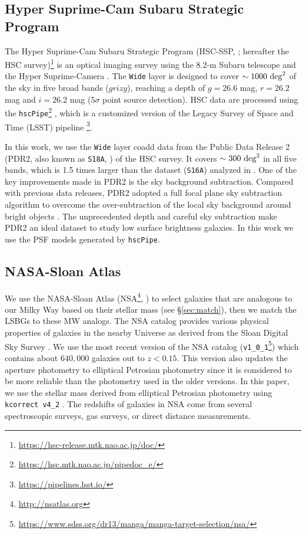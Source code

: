 \documentclass[twocolumn,astrosymb,twocolappendix]{aastex631}
\newcommand{\code}[1]{\texttt{#1}}
\begin{document}
\begin{CJK*}{UTF8}{gbsn}
\subsection{Hyper Suprime-Cam Subaru Strategic Program}
The Hyper Suprime-Cam Subaru Strategic Program (HSC-SSP, \citealt{Aihara2018}; hereafter the HSC survey)\footnote{\url{https://hsc-release.mtk.nao.ac.jp/doc/}} is an optical imaging survey using the 8.2-m Subaru telescope and the Hyper Suprime-Camera \citep{Miyazaki2012, Miyazaki2018}. The \texttt{Wide} layer is designed to cover $\sim 1000\ \rm{deg}^{2}$ of the sky in five broad bands ($grizy$), reaching a depth of $g=26.6$ mag, $r=26.2$ mag and $i=26.2$ mag ($5\sigma$ point source detection). HSC data are processed using the \code{hscPipe}\footnote{\url{https://hsc.mtk.nao.ac.jp/pipedoc_e/}} \citep{Bosch2018}, which is a customized version of the Legacy Survey of Space and Time (LSST) pipeline \citep{LSST-pipeline}\footnote{\url{https://pipelines.lsst.io/}}.

In this work, we use the \code{Wide} layer coadd data from the Public Data Release 2 (PDR2, also known as \code{S18A}, \citealt{Aihara2018}) of the HSC survey. It covers $\sim 300\ \rm{deg}^2$ in all five bands, which is 1.5 times larger than the dataset (\code{S16A}) analyzed in \citet{Greco2018}. One of the key improvements made in PDR2 is the sky background subtraction. Compared with previous data releases, PDR2 adopted a full focal plane sky subtraction algorithm to overcome the over-subtraction of the local sky background around bright objects \citep{Aihara2018,Li2021}. The unprecedented depth and careful sky subtraction make PDR2 an ideal dataset to study low surface brightness galaxies. In this work we use the PSF models generated by \code{hscPipe}. 


\subsection{NASA-Sloan Atlas}
We use the NASA-Sloan Atlas (NSA\footnote{\url{http://nsatlas.org}}, \citealt{Blanton2005,Blanton2011}) to select galaxies that are analogous to our Milky Way based on their stellar mass (see \S\ref{sec:match}), then we match the LSBGs to these MW analogs. The NSA catalog provides various physical properties of galaxies in the nearby Universe as derived from the Sloan Digital Sky Survey \citep[SDSS,][]{York2000}. We use the most recent version of the NSA catalog (\code{v1\_0\_1}\footnote{\url{https://www.sdss.org/dr13/manga/manga-target-selection/nsa/}}) which contains about $640,000$ galaxies out to $z < 0.15$. This version also updates the aperture photometry to elliptical Petrosian photometry since it is considered to be more reliable than the photometry used in the older versions. In this paper, we use the stellar mass derived from elliptical Petrosian photometry using \code{kcorrect v4\_2} \citep{Blanton2007}. The redshifts of galaxies in NSA come from several spectroscopic surveys,  gas surveys, or direct distance measurements. 


\end{CJK*}
\end{document}
